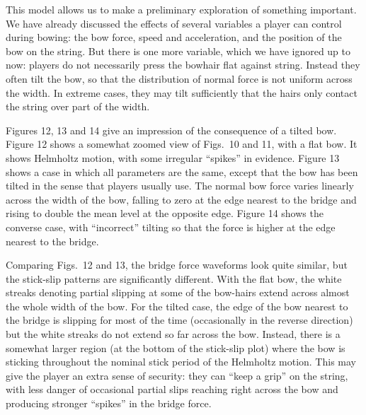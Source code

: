 
  This model allows us to make a preliminary exploration of something 
  important. We have already discussed the effects of several variables a 
  player can control during bowing: the bow force, speed and acceleration, and 
  the position of the bow on the string. But there is one more variable, which 
  we have ignored up to now: players do not necessarily press the bowhair flat 
  against string. Instead they often tilt the bow, so that the distribution of 
  normal force is not uniform across the width. In extreme cases, they may tilt 
  sufficiently that the hairs only contact the string over part of the width. 

  Figures 12, 13 and 14 give an impression of the consequence of a tilted bow. 
  Figure 12 shows a somewhat zoomed view of Figs.\ 10 and 11, with a flat bow. 
  It shows Helmholtz motion, with some irregular “spikes” in evidence. Figure 
  13 shows a case in which all parameters are the same, except that the bow has 
  been tilted in the sense that players usually use. The normal bow force 
  varies linearly across the width of the bow, falling to zero at the edge 
  nearest to the bridge and rising to double the mean level at the opposite 
  edge. Figure 14 shows the converse case, with “incorrect” tilting so that the 
  force is higher at the edge nearest to the bridge. 







  Comparing Figs.\ 12 and 13, the bridge force waveforms look quite similar, 
  but the stick-slip patterns are significantly different. With the flat bow, 
  the white streaks denoting partial slipping at some of the bow-hairs extend 
  across almost the whole width of the bow. For the tilted case, the edge of 
  the bow nearest to the bridge is slipping for most of the time (occasionally 
  in the reverse direction) but the white streaks do not extend so far across 
  the bow. Instead, there is a somewhat larger region (at the bottom of the 
  stick-slip plot) where the bow is sticking throughout the nominal stick 
  period of the Helmholtz motion. This may give the player an extra sense of 
  security: they can “keep a grip” on the string, with less danger of 
  occasional partial slips reaching right across the bow and producing stronger 
  “spikes” in the bridge force. 

